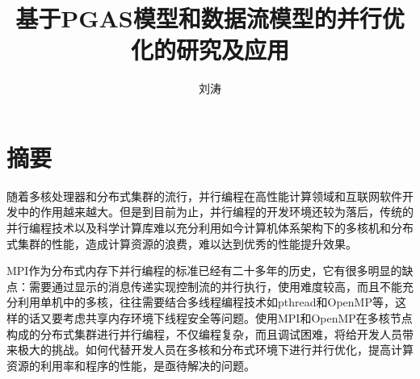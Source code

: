 \confidential{}%
\title{基于PGAS模型和数据流模型的并行优化的研究及应用}%
\author{刘涛}%
\maketitle
\makeenglishtitle
\makedeclaration
\chapter*{摘\quad 要}
\setcounter{page}{1}%

随着多核处理器和分布式集群的流行，并行编程在高性能计算领域和互联网软件开发中的作用越来越大。但是到目前为止，并行编程的开发环境还较为落后，传统的并行编程技术以及科学计算库难以充分利用如今计算机体系架构下的多核机和分布式集群的性能，造成计算资源的浪费，难以达到优秀的性能提升效果。

MPI作为分布式内存下并行编程的标准已经有二十多年的历史，它有很多明显的缺点：需要通过显示的消息传递实现控制流的并行执行，使用难度较高，而且不能充分利用单机中的多核，往往需要结合多线程编程技术如pthread和OpenMP等，这样的话又要考虑共享内存环境下线程安全等问题。使用MPI和OpenMP在多核节点构成的分布式集群进行并行编程，不仅编程复杂，而且调试困难，将给开发人员带来极大的挑战。如何代替开发人员在多核和分布式环境下进行并行优化，提高计算资源的利用率和程序的性能，是亟待解决的问题。

